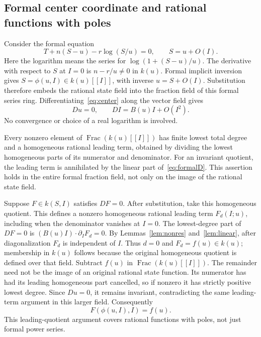 \documentclass[11pt,a4paper]{article}
\DeclareMathOperator{\Frac}{Frac}
\begin{document}
\subsection{Formal center coordinate and rational functions with poles}
Consider the formal equation
\begin{equation}\label{eq:center}
 T+n(S-u)-r\log(S/u)=0,\qquad S=u+O(I).
\end{equation}
Here the logarithm means the series for $\log(1+(S-u)/u)$. The derivative with respect to $S$ at $I=0$ is $n-r/u\ne0$ in $k(u)$. Formal implicit inversion gives $S=\phi(u,I)\in k(u)[[I]]$, with inverse $u=S+O(I)$. Substitution therefore embeds the rational state field into the fraction field of this formal series ring. Differentiating~\eqref{eq:center} along the vector field gives
\begin{equation}\label{eq:formalD}
 Du=0,\qquad DI=B(u)I+O(I^2).
\end{equation}
No convergence or choice of a real logarithm is involved.

Every nonzero element of $\Frac(k(u)[[I]])$ has finite lowest total degree and a homogeneous rational leading term, obtained by dividing the lowest homogeneous parts of its numerator and denominator. For an invariant quotient, the leading term is annihilated by the linear part of~\eqref{eq:formalD}. This assertion holds in the entire formal fraction field, not only on the image of the rational state field.

Suppose $F\in k(S,I)$ satisfies $DF=0$. After substitution, take this homogeneous quotient. This defines a nonzero homogeneous rational leading term $F_d(I;u)$, including when the denominator vanishes at $I=0$. The lowest-degree part of $DF=0$ is
$(B(u)I)\cdot\partial_I F_d=0$. By Lemmas~\ref{lem:nonres} and~\ref{lem:linear}, after diagonalization $F_d$ is independent of $I$. Thus $d=0$ and $F_d=f(u)\in k(u)$; membership in $k(u)$ follows because the original homogeneous quotient is defined over that field. Subtract $f(u)$ in $\Frac(k(u)[[I]])$. The remainder need not be the image of an original rational state function. Its numerator has had its leading homogeneous part cancelled, so if nonzero it has strictly positive lowest degree. Since $Du=0$, it remains invariant, contradicting the same leading-term argument in this larger field. Consequently
\begin{equation}\label{eq:Ff}
 F(\phi(u,I),I)=f(u).
\end{equation}
This leading-quotient argument covers rational functions with poles, not just formal power series.
\end{document}

